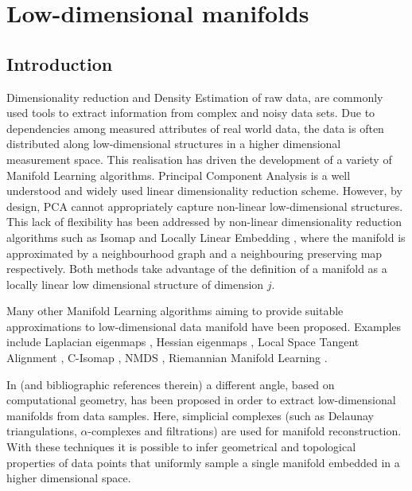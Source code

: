 \chapter{Low-dimensional manifolds}
\label{ch:manifolds}

\section{Introduction}


Dimensionality reduction and Density Estimation of raw data, are commonly used tools to extract information from complex and noisy data sets.
Due to dependencies among measured attributes of real world data,
the data is often distributed along low-dimensional structures in a higher dimensional measurement space.
This realisation has driven the development of a variety of Manifold Learning algorithms.
Principal Component Analysis \citep[PCA, ][]{Pearson1901} is a well understood and widely used linear dimensionality reduction scheme. 
However, by design, PCA cannot appropriately capture non-linear low-dimensional structures.
This lack of flexibility has been addressed by non-linear dimensionality reduction algorithms such as Isomap \cite{Tenenbaum2319}
and Locally Linear Embedding \citep[LLE][]{Roweis00nonlineardimensionality},
where the manifold is approximated by a neighbourhood graph and a neighbouring preserving map respectively.
Both methods take advantage of the definition of a manifold as a locally linear low dimensional structure of dimension $j$.

Many other Manifold Learning algorithms aiming to provide suitable approximations to low-dimensional data manifold have been proposed.
Examples include Laplacian eigenmaps \citep{Belkin01laplacianeigenmaps},
Hessian eigenmaps \citep{Donoho5591},
Local Space Tangent Alignment \citep[LSTA, ][]{Zhang02principalmanifolds},
C-Isomap \citep[an extension of Isomap to conformal embeddings][]{Silva:2002:GVL:2968618.2968708},
NMDS \citep[non-metric formulation of Multidimensional Scaling (MDS)][]{doi:10.1002/bs.3830040308, Cox2008, Kruskal1964},
Riemannian Manifold Learning \citep[RML, ][]{10.1109/TPAMI.2007.70735}.

In \cite{boissonnat:hal-01615863} (and bibliographic references therein) a different angle, based on computational geometry, 
has been proposed in order to extract low-dimensional manifolds from data samples.
Here, simplicial complexes (such as Delaunay triangulations, $\alpha$-complexes and filtrations)
are used for manifold reconstruction.
With these techniques it is possible to infer geometrical and topological properties of data points 
that uniformly sample a single manifold embedded in a higher dimensional space.

